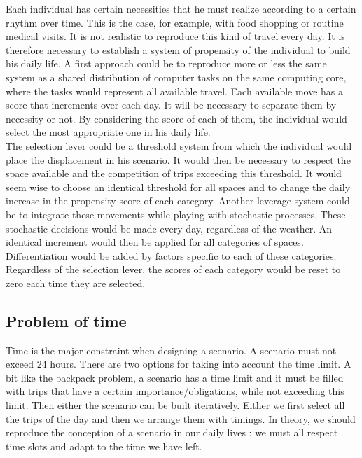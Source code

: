 Each individual has certain necessities that he must realize according to a certain rhythm over time. This is the case, for example, with food shopping or routine medical visits. It is not realistic to reproduce this kind of travel every day. It is therefore necessary to establish a system of propensity of the individual to build his daily life. A first approach could be to reproduce more or less the same system as a shared distribution of computer tasks on the same computing core, where the tasks would represent all available travel. Each available move has a score that increments over each day. It will be necessary to separate them by necessity or not. By considering the score of each of them, the individual would select the most appropriate one in his daily life.\\

The selection lever could be a threshold system from which the individual would place the displacement in his scenario. It would then be necessary to respect the space available and the competition of trips exceeding this threshold. It would seem wise to choose an identical threshold for all spaces and to change the daily increase in the propensity score of each category. Another leverage system could be to integrate these movements while playing with stochastic processes. These stochastic decisions would be made every day, regardless of the weather. An identical increment would then be applied for all categories of spaces. Differentiation would be added by factors specific to each of these categories. Regardless of the selection lever, the scores of each category would be reset to zero each time they are selected.\\

\subsection{Problem of time}

Time is the major constraint when designing a scenario. A scenario must not exceed 24 hours. There are two options for taking into account the time limit. A bit like the backpack problem, a scenario has a time limit and it must be filled with trips that have a certain importance/obligations, while not exceeding this limit. Then either the scenario can be built iteratively. Either we first select all the trips of the day and then we arrange them with timings. In theory, we should reproduce the conception of a scenario in our daily lives : we must all respect time slots and adapt to the time we have left.\\

